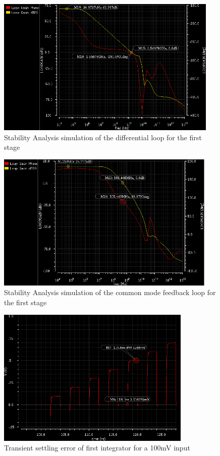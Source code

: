 \documentclass[conference]{IEEEtran}
\begin{document}
\begin{figure}[H]
\centering
\includegraphics[height=250px]{piktures/st2_diff_ac}
\caption{Stability Analysis simulation of the differential loop for the first stage}
\label{fig:st2_diff_ac}
\end{figure}

\begin{figure}[H]
\centering
\includegraphics[height=250px]{piktures/st2_cm_ac}
\caption{Stability Analysis simulation of the common mode feedback loop for the first stage}
\label{fig:st2_cm_ac}
\end{figure}




\begin{figure}[H]
\centering
\includegraphics[height=250px]{piktures/st1_error}
\caption{Transient settling error of first integrator for a 100mV input}
\label{fig:st1_error}
\end{figure}
\end{document}

